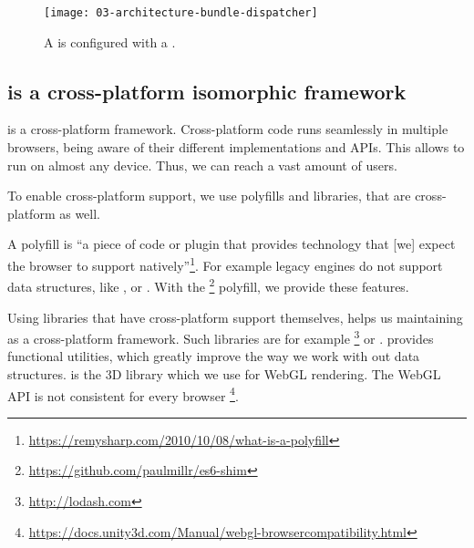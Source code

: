 \documentclass[../../ClassicThesis.tex]{subfiles}
\begin{document}
\begin{figure}
  \centering
  \texttt{[image: 03-architecture-bundle-dispatcher]}
  \caption{A  is configured with a .}
  \label{fig:bundle-dispatcher}
\end{figure}






\subsection{{\convertify} is a cross-platform isomorphic framework}
\label{sec:convertify-is-isomorphic}

{\convertify} is a cross-platform framework. Cross-platform
{\javascript} code runs seamlessly in multiple browsers, being aware
of their different implementations and APIs. This allows {\convertify}
to run on almost any device. Thus, we can reach a vast amount of
users.


To enable cross-platform {\javascript} support, we use polyfills and
libraries, that are cross-platform as well.

A polyfill is \enquote{a
  piece of code or plugin that provides technology that [we] expect
  the browser to support
  natively}\footnote{\url{https://remysharp.com/2010/10/08/what-is-a-polyfill}}.
For example legacy {\javascript} engines do not support data
structures, like ,  or . With the
\footnote{\url{https://github.com/paulmillr/es6-shim}}
polyfill, we provide these features.

Using libraries that have cross-platform support themselves, helps us
maintaining {\convertify} as a cross-platform framework. Such
libraries are for example
\footnote{\url{http://lodash.com}} or {\threejs}.
 provides functional utilities, which greatly improve the
way we work with out data structures. {\threejs} is the 3D library
which we use for WebGL rendering. The WebGL API is not consistent for every browser
\footnote{\url{https://docs.unity3d.com/Manual/webgl-browsercompatibility.html}}.
\end{document}

